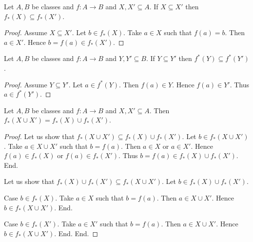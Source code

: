 \documentclass[10pt]{article}
\begin{document}
  \begin{forthel}
    \begin{proposition}[id=FOUNDATIONS_07_7396318576115712,printid]
      Let $A, B$ be classes and $f : A \to B$ and $X, X' \subseteq A$.
      If $X \subseteq X'$ then $f_{*}(X) \subseteq f_{*}(X')$.
    \end{proposition}
    \begin{proof}
      Assume $X \subseteq X'$.
      Let $b \in f_{*}(X)$.
      Take $a \in X$ such that $f(a) = b$.
      Then $a \in X'$.
      Hence $b = f(a) \in f_{*}(X')$.
    \end{proof}
  \end{forthel}

  \begin{forthel}
    \begin{proposition}[id=FOUNDATIONS_07_8376448628817920,printid]
      Let $A, B$ be classes and $f : A \to B$ and $Y, Y' \subseteq B$.
      If $Y \subseteq Y'$ then $f^{*}(Y) \subseteq f^{*}(Y')$.
    \end{proposition}
    \begin{proof}
      Assume $Y \subseteq Y'$.
      Let $a \in f^{*}(Y)$.
      Then $f(a) \in Y$.
      Hence $f(a) \in Y'$.
      Thus $a \in f^{*}(Y')$.
    \end{proof}
  \end{forthel}

  \begin{forthel}
    \begin{proposition}[id=FOUNDATIONS_07_4448961469349888,printid]
      Let $A, B$ be classes and $f : A \to B$ and $X, X' \subseteq A$.
      Then $f_{*}(X \cup X') = f_{*}(X) \cup f_{*}(X')$.
    \end{proposition}
    \begin{proof}
      Let us show that $f_{*}(X \cup X') \subseteq f_{*}(X) \cup f_{*}(X')$.
        Let $b \in f_{*}(X \cup X')$.
        Take $a \in X \cup X'$ such that $b = f(a)$.
        Then $a \in X$ or $a \in X'$.
        Hence $f(a) \in f_{*}(X)$ or $f(a) \in f_{*}(X')$.
        Thus $b = f(a) \in f_{*}(X) \cup f_{*}(X')$.
      End.

      Let us show that $f_{*}(X) \cup f_{*}(X') \subseteq f_{*}(X \cup X')$.
        Let $b \in f_{*}(X) \cup f_{*}(X')$.

        Case $b \in f_{*}(X)$.
          Take $a \in X$ such that $b = f(a)$.
          Then $a \in X \cup X'$.
          Hence $b \in f_{*}(X \cup X')$.
        End.

        Case $b \in f_{*}(X')$.
          Take $a \in X'$ such that $b = f(a)$.
          Then $a \in X \cup X'$.
          Hence $b \in f_{*}(X \cup X')$.
        End.
      End.
    \end{proof}
  \end{forthel}
\end{document}
